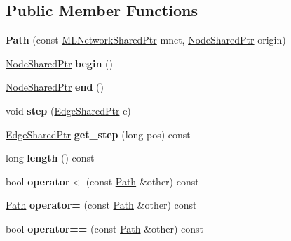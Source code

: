 \subsection*{Public Member Functions}
\begin{DoxyCompactItemize}
\item 
\hypertarget{classmlnet_1_1_path_aa9c641ba5a1fbee6f83a6e295047bb54}{{\bfseries Path} (const \hyperlink{namespacemlnet_aa6d3fa87865bcde4d1283abb1942cbbb}{M\+L\+Network\+Shared\+Ptr} mnet, \hyperlink{namespacemlnet_acf8b1b6deb52e7dacfc676c689f9a10c}{Node\+Shared\+Ptr} origin)}\label{classmlnet_1_1_path_aa9c641ba5a1fbee6f83a6e295047bb54}

\item 
\hypertarget{classmlnet_1_1_path_aa283a2f26d1b08fd29687f2249229ed8}{\hyperlink{namespacemlnet_acf8b1b6deb52e7dacfc676c689f9a10c}{Node\+Shared\+Ptr} {\bfseries begin} ()}\label{classmlnet_1_1_path_aa283a2f26d1b08fd29687f2249229ed8}

\item 
\hypertarget{classmlnet_1_1_path_a877e86a54ce6ecdadc52711ea96bb85f}{\hyperlink{namespacemlnet_acf8b1b6deb52e7dacfc676c689f9a10c}{Node\+Shared\+Ptr} {\bfseries end} ()}\label{classmlnet_1_1_path_a877e86a54ce6ecdadc52711ea96bb85f}

\item 
\hypertarget{classmlnet_1_1_path_a43c02fff1cc86d839e4a4690cf658fa8}{void {\bfseries step} (\hyperlink{namespacemlnet_a33e88c3df9bea691a269d5e5d8bea57d}{Edge\+Shared\+Ptr} e)}\label{classmlnet_1_1_path_a43c02fff1cc86d839e4a4690cf658fa8}

\item 
\hypertarget{classmlnet_1_1_path_a8c833dbc418fa7e1762de4d17bf3f1d9}{\hyperlink{namespacemlnet_a33e88c3df9bea691a269d5e5d8bea57d}{Edge\+Shared\+Ptr} {\bfseries get\+\_\+step} (long pos) const }\label{classmlnet_1_1_path_a8c833dbc418fa7e1762de4d17bf3f1d9}

\item 
\hypertarget{classmlnet_1_1_path_a4fec50926ccf59d9c0ea2ad8a9573548}{long {\bfseries length} () const }\label{classmlnet_1_1_path_a4fec50926ccf59d9c0ea2ad8a9573548}

\item 
\hypertarget{classmlnet_1_1_path_affa5ff7e42e1ff204b7869f9b6024c68}{bool {\bfseries operator$<$} (const \hyperlink{classmlnet_1_1_path}{Path} \&other) const }\label{classmlnet_1_1_path_affa5ff7e42e1ff204b7869f9b6024c68}

\item 
\hypertarget{classmlnet_1_1_path_a9988075c10634646e840145eeaef926f}{\hyperlink{classmlnet_1_1_path}{Path} {\bfseries operator=} (const \hyperlink{classmlnet_1_1_path}{Path} \&other) const }\label{classmlnet_1_1_path_a9988075c10634646e840145eeaef926f}

\item 
\hypertarget{classmlnet_1_1_path_a40ab4743e4391bc08a7498ad246902bf}{bool {\bfseries operator==} (const \hyperlink{classmlnet_1_1_path}{Path} \&other) const }\label{classmlnet_1_1_path_a40ab4743e4391bc08a7498ad246902bf}

\end{DoxyCompactItemize}


